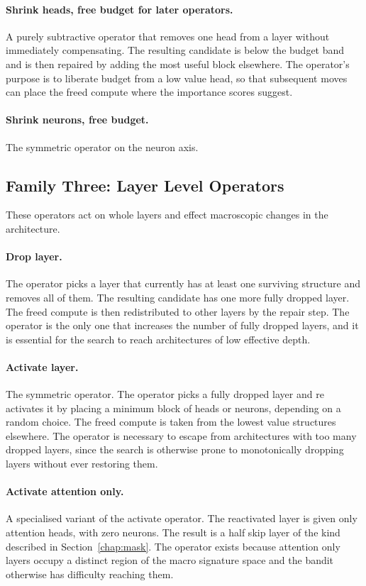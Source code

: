 \paragraph{Shrink heads, free budget for later operators.} A purely subtractive operator that removes one head from a layer without immediately compensating. The resulting candidate is below the budget band and is then repaired by adding the most useful block elsewhere. The operator's purpose is to liberate budget from a low value head, so that subsequent moves can place the freed compute where the importance scores suggest.

\paragraph{Shrink neurons, free budget.} The symmetric operator on the neuron axis.

\subsection{Family Three: Layer Level Operators}

These operators act on whole layers and effect macroscopic changes in the architecture.

\paragraph{Drop layer.} The operator picks a layer that currently has at least one surviving structure and removes all of them. The resulting candidate has one more fully dropped layer. The freed compute is then redistributed to other layers by the repair step. The operator is the only one that increases the number of fully dropped layers, and it is essential for the search to reach architectures of low effective depth.

\paragraph{Activate layer.} The symmetric operator. The operator picks a fully dropped layer and re activates it by placing a minimum block of heads or neurons, depending on a random choice. The freed compute is taken from the lowest value structures elsewhere. The operator is necessary to escape from architectures with too many dropped layers, since the search is otherwise prone to monotonically dropping layers without ever restoring them.

\paragraph{Activate attention only.} A specialised variant of the activate operator. The reactivated layer is given only attention heads, with zero neurons. The result is a half skip layer of the kind described in Section~\ref{chap:mask}. The operator exists because attention only layers occupy a distinct region of the macro signature space and the bandit otherwise has difficulty reaching them.

